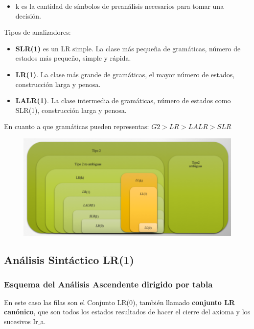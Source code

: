 \documentclass[12pt, twoside, openright]{report} %
\begin{document}
\begin{itemize}
  \item k es la cantidad de símbolos de preanálisis necesarios para tomar una decisión.
\end{itemize}

Tipos de analizadores:
\begin{itemize}
  \item \textbf{SLR(1)} es un LR simple. La clase más pequeña de gramáticas, número de estados más pequeño, simple y rápida.
  \item \textbf{LR(1)}. La clase más grande de gramáticas, el mayor número de estados, construcción larga y penosa.
  \item \textbf{LALR(1)}. La clase intermedia de gramáticas, número de estados como SLR(1), construcción larga y penosa.
\end{itemize}
En cuanto a que gramáticas pueden representas: $G2>LR>LALR>SLR$

\begin{figure}[H]
	{\includegraphics[scale=.57]{2021-04-13 15_35_24-ASintactico.pdf - Foxit Reader.png}}
\end{figure}

\subsection{Análisis Sintáctico LR(1)}

\subsubsection{Esquema del Análisis Ascendente dirigido por tabla}
En este caso las filas son el Conjunto LR(0), también llamado \textbf{conjunto LR canónico}, que son todos los estados resultados de hacer el cierre del axioma y los sucesivos Ir$\_$a.
\end{document}
